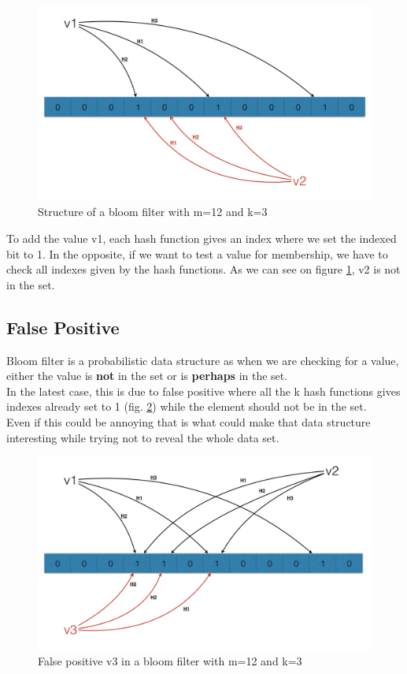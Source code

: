 \documentclass{eplmastersthesis}
\begin{document}
\begin{figure}[h!]
	\begin{center}
		\includegraphics[scale=0.3]{res/bloom-1}
		\caption{Structure of a bloom filter with m=12 and k=3}
		\label{bloom-1}
	\end{center}
\end{figure}

To add the value v1, each hash function gives an index where we set the indexed bit to 1. In the opposite, if we want to test a value for membership, we have to check all indexes given by the hash functions. As we can see on figure \ref{bloom-1}, v2 is not in the set.

\subsection{False Positive}

Bloom filter is a probabilistic data structure as when we are checking for a value, either the value is \textbf{not} in the set or is \textbf{perhaps} in the set. \\
In the latest case, this is due to false positive where all the k hash functions gives indexes already set to 1 (fig. \ref{bloom-2}) while the element should not be in the set.\\
Even if this could be annoying that is what could make that data structure interesting while trying not to reveal the whole data set.
\begin{figure}[h!]
	\begin{center}
		\includegraphics[scale=0.3]{res/bloom-2}
		\caption{False positive v3 in a bloom filter with m=12 and k=3}
		\label{bloom-2}
	\end{center}
\end{figure}
\end{document}

